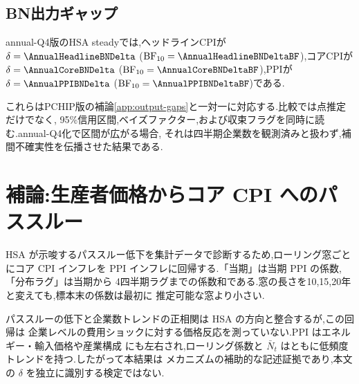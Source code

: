 \documentclass[11pt]{article}
\begin{document}
\begin{table}[H]
\centering
\caption{annual-Q4版:HP出力ギャップの価格指標・モデル別ベースライン推定結果.}
\label{tab:annual-output-gap-hp}
\tiny
\resizebox{\linewidth}{!}{}
\end{table}

\subsection{BN出力ギャップ}
annual-Q4版のHSA steadyでは,ヘッドラインCPIが
$\delta=\AnnualHeadlineBNDelta$ ($\mathrm{BF}_{10}=\AnnualHeadlineBNDeltaBF$),コアCPIが
$\delta=\AnnualCoreBNDelta$ ($\mathrm{BF}_{10}=\AnnualCoreBNDeltaBF$),PPIが
$\delta=\AnnualPPIBNDelta$ ($\mathrm{BF}_{10}=\AnnualPPIBNDeltaBF$)である.

\begin{table}[H]
\centering
\caption{annual-Q4版:BN出力ギャップの価格指標・モデル別ベースライン推定結果.}
\label{tab:annual-output-gap-bn}
\tiny
\resizebox{\linewidth}{!}{}
\end{table}

これらはPCHIP版の補論\ref{app:output-gaps}と一対一に対応する.比較では点推定だけでなく,
95\%信用区間,ベイズファクター,および収束フラグを同時に読む.annual-Q4化で区間が広がる場合,
それは四半期企業数を観測済みと扱わず,補間不確実性を伝播させた結果である.

\section{補論:生産者価格からコア CPI へのパススルー}
\label{app:passthrough}
HSA が示唆するパススルー低下を集計データで診断するため,ローリング窓ごとにコア CPI
インフレを PPI インフレに回帰する.「当期」は当期 PPI の係数,「分布ラグ」は当期から
4四半期ラグまでの係数和である.窓の長さを10,15,20年と変えても,標本末の係数は最初に
推定可能な窓より小さい.

\begin{table}[H]
\centering
\caption{PPI--コア CPI パススルーのローリングOLS診断.相関はローリング推定値と主仕様の
事後平均 $\bar N_t$ の相関.}
\label{tab:passthrough}

\end{table}

\noindent パススルーの低下と企業数トレンドの正相関は HSA の方向と整合するが,この回帰は
企業レベルの費用ショックに対する価格反応を測っていない.PPI はエネルギー・輸入価格や産業構成
にも左右され,ローリング係数と $\bar N_t$ はともに低頻度トレンドを持つ.したがって本結果は
メカニズムの補助的な記述証拠であり,本文の $\delta$ を独立に識別する検定ではない.
\end{document}
